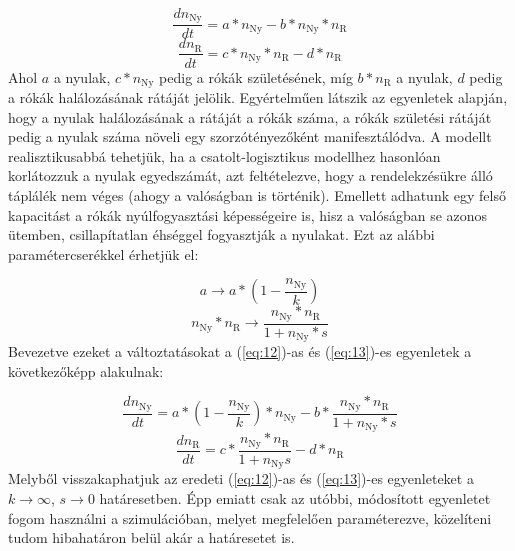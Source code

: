 \begin{multicols}{2}
\begin{equation} \label{eq:12}
    \frac{dn_{\text{Ny}}}{dt} = a * n_{\text{Ny}} - b * n_{\text{Ny}} * n_{\text{R}}
\end{equation}
\begin{equation} \label{eq:13}
    \frac{dn_{\text{R}}}{dt} = c * n_{\text{Ny}} * n_{\text{R}} - d * n_{\text{R}}
\end{equation}
Ahol $a$ a nyulak, $c * n_{\text{Ny}}$ pedig a rókák születésének, míg $b * n_{\text{R}}$ a nyulak, $d$ pedig a rókák halálozásának rátáját jelölik. Egyértelműen látszik az egyenletek alapján, hogy a nyulak halálozásának a rátáját a rókák száma, a rókák születési rátáját pedig a nyulak száma növeli egy szorzótényezőként manifesztálódva. A modellt realisztikusabbá tehetjük, ha a csatolt-logisztikus modellhez hasonlóan korlátozzuk a nyulak egyedszámát, azt feltételezve, hogy a rendelekzésükre álló táplálék nem véges (ahogy a valóságban is történik). Emellett adhatunk egy felső kapacitást a rókák nyúlfogyasztási képességeire is, hisz a valóságban se azonos ütemben, csillapítatlan éhséggel fogyasztják a nyulakat. Ezt az alábbi paramétercserékkel érhetjük el:

\begin{equation} \label{eq:14}
    a \to a * \left( 1 - \frac{n_{\text{Ny}}}{k} \right)
\end{equation}
\begin{equation} \label{eq:15}
    n_{\text{Ny}} * n_{\text{R}} \to \frac{n_{\text{Ny}} * n_{\text{R}}}{1 + n_{\text{Ny}} * s}
\end{equation}
Bevezetve ezeket a változtatásokat a (\ref{eq:12})-as és (\ref{eq:13})-es egyenletek a következőképp alakulnak:

\begin{equation} \label{eq:16}
    \frac{dn_{\text{Ny}}}{dt} = a * \left( 1 - \frac{n_{\text{Ny}}}{k} \right) * n_{\text{Ny}} - b * \frac{n_{\text{Ny}} * n_{\text{R}}}{1 + n_{\text{Ny}} * s}
\end{equation}
\begin{equation} \label{eq:17}
    \frac{dn_{\text{R}}}{dt} = c * \frac{n_{\text{Ny}} * n_{\text{R}}}{1 + n_{\text{Ny}} s} - d * n_{\text{R}}
\end{equation}
Melyből visszakaphatjuk az eredeti (\ref{eq:12})-as és (\ref{eq:13})-es egyenleteket a $k \to \infty$, $s \to 0$ határesetben. Épp emiatt csak az utóbbi, módosított egyenletet fogom használni a szimulációban, melyet megfelelően paraméterezve, közelíteni tudom hibahatáron belül akár a határesetet is.


\end{multicols}
